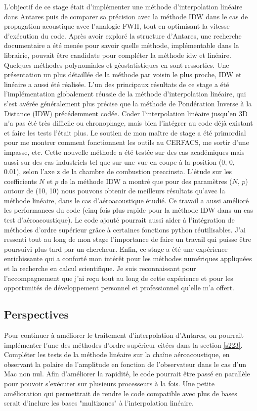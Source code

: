 L'objectif de ce stage était d'implémenter une méthode d'interpolation linéaire dans Antares puis de comparer sa précision avec la méthode IDW dans le cas de propagation acoustique avec l'analogie FWH, tout en optimisant la vitesse d'exécution du code.
Après avoir exploré la structure d'Antares, une recherche documentaire a été menée pour savoir quelle méthode, implémentable dans la librairie, pouvait être candidate pour compléter la méthode idw et linéaire. Quelques méthodes polynomiales et géostatistiques en sont ressorties. Une présentation un plus détaillée de la méthode par voisin le plus proche, IDW et linéaire a aussi été réalisée.
L'un des principaux résultats de ce stage a été l'implémentation globalement réussie de la méthode d'interpolation linéaire, qui s'est avérée généralement plus précise que la méthode de Pondération Inverse à la Distance (IDW) précédemment codée.
Coder l'interpolation linéaire jusqu'en 3D n'a pas été très difficile ou chronophage, mais bien l'intégrer au code déjà existant et faire les tests l'était plus. Le soutien de mon maître de stage a été primordial pour me montrer comment fonctionnent les outils au CERFACS, me sortir d'une impasse, etc.
Cette nouvelle méthode a été testée sur des cas académiques mais aussi sur des cas industriels tel que sur une vue en coupe à la position (0, 0, 0.01), selon l'axe z de la chambre de combustion preccinsta.
L'étude sur les coefficients \(N\) et \(p\) de la méthode IDW a montré que pour des paramètres (\(N\), \(p\)) autour de (10, 10) nous pouvons obtenir de meilleurs résultats qu'avec la méthode linéaire, dans le cas d'aéroacoustique étudié.
Ce travail a aussi amélioré les performances du code (cinq fois plus rapide pour la méthode IDW dans un cas test d'aéroacoustique).
Le code ajouté pourrait aussi aider à l'intégration de méthodes d'ordre supérieur grâce à certaines fonctions python réutilisables.
J'ai ressenti tout au long de mon stage l'importance de faire un travail qui puisse être poursuivi plus tard par un chercheur.
Enfin, ce stage a été une expérience enrichissante qui a conforté mon intérêt pour les méthodes numériques appliquées et la recherche en calcul scientifique. Je suis reconnaissant pour l'accompagnement que j'ai reçu tout au long de cette expérience et pour les opportunités de développement personnel et professionnel qu'elle m'a offert.

\subsection*{Perspectives}
Pour continuer à améliorer le traitement d'interpolation d'Antares, on pourrait implémenter l'une des méthodes d'ordre supérieur citées dans la section \ref{s223}.
Compléter les tests de la méthode linéaire sur la chaîne aéroacoustique, en observant la polaire de l'amplitude en fonction de l'observateur dans le cas d'un Mac non nul.
Afin d'améliorer la rapidité, le code pourrait être passé en parallèle pour pouvoir s’exécuter sur plusieurs processeurs à la fois.
Une petite amélioration qui permettrait de rendre le code compatible avec plus de bases serait d'inclure les bases "multizones" à l'interpolation linéaire.



